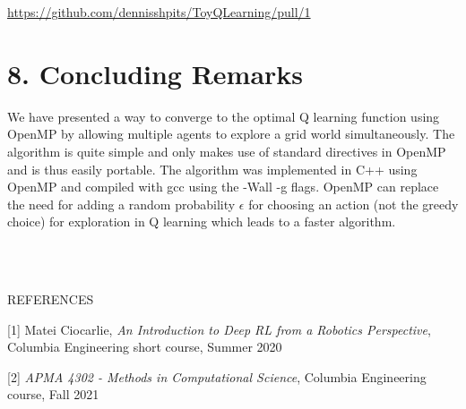 \documentclass[12pt]{article}
\begin{document}
\url{https://github.com/dennisshpits/ToyQLearning/pull/1}

\section*{8. Concluding Remarks}
We have presented a way to converge to the optimal Q learning function
using OpenMP by allowing multiple agents to explore a grid world simultaneously.
The algorithm is quite
simple and only makes use of standard directives in OpenMP
and is thus easily portable. The algorithm was implemented
in C++ using OpenMP and compiled with gcc using the -Wall -g flags.
OpenMP can replace the need for adding a random probability $\epsilon$
for choosing an action (not the greedy choice) for exploration in Q learning which 
leads to a faster algorithm.

~\\~

\centerline{REFERENCES}

[1] Matei Ciocarlie, \textit{An Introduction to Deep RL from a Robotics Perspective},
Columbia Engineering short course, Summer 2020

[2] \textit{APMA 4302 - Methods in Computational Science},
Columbia Engineering course, Fall 2021
\end{document}
